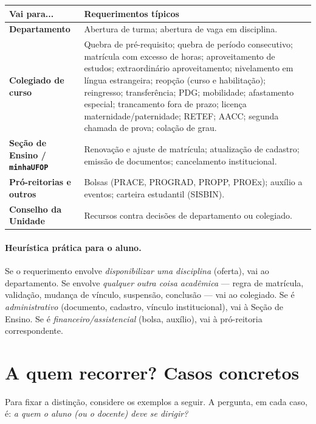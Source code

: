 \documentclass[10pt,a4paper]{extarticle}
\newcommand{\impt}[1]{\textcolor{important}{#1}}
\begin{document}
\begin{center}
\renewcommand{\arraystretch}{1.25}
\begin{tabularx}{\textwidth}{@{} l X @{}}
\toprule
\textbf{Vai para...} & \textbf{Requerimentos típicos} \\
\midrule
\textbf{Departamento} & Abertura de turma; abertura de vaga em disciplina. \\
\midrule
\textbf{Colegiado de curso} & Quebra de pré-requisito; quebra de período consecutivo; matrícula com excesso de horas; aproveitamento de estudos; extraordinário aproveitamento; nivelamento em língua estrangeira; reopção (curso e habilitação); reingresso; transferência; PDG; mobilidade; afastamento especial; trancamento fora de prazo; licença maternidade/paternidade; RETEF; AACC; segunda chamada de prova; colação de grau. \\
\midrule
\textbf{Seção de Ensino / \texttt{minhaUFOP}} & Renovação e ajuste de matrícula; atualização de cadastro; emissão de documentos; cancelamento institucional. \\
\midrule
\textbf{Pró-reitorias e outros} & Bolsas (PRACE, PROGRAD, PROPP, PROEx); auxílio a eventos; carteira estudantil (SISBIN). \\
\midrule
\textbf{Conselho da Unidade} & Recursos contra decisões de departamento ou colegiado. \\
\bottomrule
\end{tabularx}
\end{center}

\paragraph{Heurística prática para o aluno.} Se o requerimento envolve \emph{disponibilizar uma disciplina} (oferta), vai ao \impt{departamento}. Se envolve \emph{qualquer outra coisa acadêmica} --- regra de matrícula, validação, mudança de vínculo, suspensão, conclusão --- vai ao \impt{colegiado}. Se é \emph{administrativo} (documento, cadastro, vínculo institucional), vai à Seção de Ensino. Se é \emph{financeiro/assistencial} (bolsa, auxílio), vai à pró-reitoria correspondente.

\section{A quem recorrer? Casos concretos}

Para fixar a distinção, considere os exemplos a seguir. A pergunta, em cada caso, é: \emph{a quem o aluno (ou o docente) deve se dirigir?}
\end{document}
